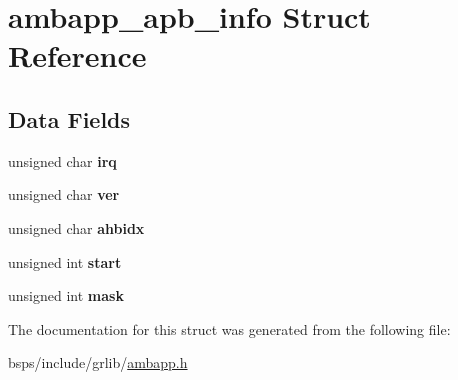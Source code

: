 \hypertarget{structambapp__apb__info}{}\section{ambapp\+\_\+apb\+\_\+info Struct Reference}
\label{structambapp__apb__info}
\subsection*{Data Fields}
\begin{DoxyCompactItemize}
\item 
\mbox{\label{structambapp__apb__info_a3d313297355e559acd6d8a6464158b63}} 
unsigned char {\bfseries irq}
\item 
\mbox{\label{structambapp__apb__info_a6093ad08bc9ce4b39b809b982f6afc9c}} 
unsigned char {\bfseries ver}
\item 
\mbox{\label{structambapp__apb__info_a7113525aed963d573b340064719ea11c}} 
unsigned char {\bfseries ahbidx}
\item 
\mbox{\label{structambapp__apb__info_a579d231b144835d95a5c1238f4cdd3f1}} 
unsigned int {\bfseries start}
\item 
\mbox{\label{structambapp__apb__info_abc2383596ca7b4a4aae7dfe29287ee9d}} 
unsigned int {\bfseries mask}
\end{DoxyCompactItemize}


The documentation for this struct was generated from the following file\+:\begin{DoxyCompactItemize}
\item 
bsps/include/grlib/\mbox{\hyperlink{ambapp_8h}{ambapp.\+h}}\end{DoxyCompactItemize}
